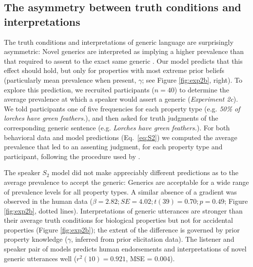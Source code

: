\documentclass[10pt,letterpaper]{article}
\newcommand{\ndg}[1]{\textcolor{Green}{[ndg: #1]}}
\begin{document}
\subsection*{The asymmetry between truth conditions and interpretations}
The truth conditions and interpretations of generic language are surprisingly asymmetric: Novel generics are interpreted as implying a higher prevalence than that required to assent to the exact same generic \cite{Cimpian2010}.
Our model predicts that this effect should hold, but only for properties with most extreme prior beliefs (particularly mean prevalence when present, $\gamma$; see Figure \ref{fig:exp2b}, right).
To explore this prediction, we recruited participants ($n=40$) to determine the average prevalence at which a speaker would assert a generic ({\it Experiment 2c}). 
We told participants one of five frequencies for each property type (e.g. \emph{50\% of lorches have green feathers.}), and then asked for truth judgments of the corresponding generic sentence (e.g. \emph{Lorches have green feathers.}). 
For both behavioral data and model predictions (Eq.~\ref{eq:S2})  we computed the average prevalence that led to an assenting judgment, for each property type and participant, following the procedure used by \cite{Cimpian2010}.
%

The speaker $S_2$ model did not make appreciably different predictions as to the average prevalence to accept the generic:
Generics are acceptable for a wide range of prevalence levels for all property types.
A similar absence of a gradient was observed in the human data ($\beta = 2.82; SE = 4.02; t(39) = 0.70; p = 0.49$; Figure \ref{fig:exp2b}, dotted lines). 
Interpretations of generic utterances are stronger than their average truth conditions for biological properties but not for accidental properties (Figure \ref{fig:exp2b}); the extent of the difference is governed by prior property knowledge ($\gamma$, inferred from prior elicitation data).
The listener and speaker pair of models predicts human endorsements and interpretations of novel generic utterances well ($r^2(10) = 0.921$, MSE = 0.004). 
\end{document}
